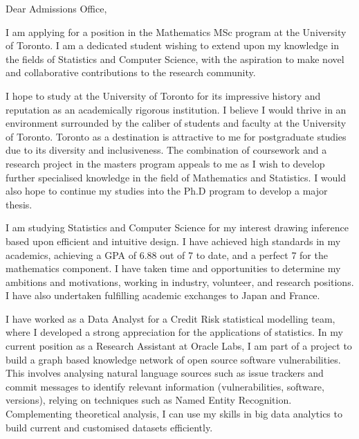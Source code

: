 
\noindent
Dear Admissions Office,
\vspace*{10pt}

I am applying for a position in the Mathematics MSc program at the University of Toronto. I am a dedicated student wishing to extend upon my knowledge in the fields of Statistics and Computer Science, with the aspiration to make novel and collaborative contributions to the research community. 
\vspace*{10pt}

I hope to study at the University of Toronto for its impressive history and reputation as an academically rigorous institution. I believe I would thrive in an environment surrounded by the caliber of students and faculty at the University of Toronto. Toronto as a destination is attractive to me for postgraduate studies due to its diversity and inclusiveness. The combination of coursework and a research project in the masters program appeals to me as I wish to develop further specialised knowledge in the field of Mathematics and Statistics. I would also hope to continue my studies into the Ph.D program to develop a major thesis.
\vspace*{10pt}

I am studying Statistics and Computer Science for my interest drawing inference based upon efficient and intuitive design. I have achieved high standards in my academics, achieving a GPA of 6.88 out of 7 to date, and a perfect 7 for the mathematics component. I have taken time and opportunities to determine my ambitions and motivations, working in industry, volunteer, and research positions. I have also undertaken fulfilling academic exchanges to Japan and France.
\vspace*{10pt}

I have worked as a Data Analyst for a Credit Risk statistical modelling team, where I developed a strong appreciation for the applications of statistics. In my current position as a Research Assistant at Oracle Labs, I am part of a project to build a graph based knowledge network of open source software vulnerabilities. This involves analysing natural language sources such as issue trackers and commit messages to identify relevant information (vulnerabilities, software, versions), relying on techniques such as Named Entity Recognition. Complementing theoretical analysis, I can use my skills in big data analytics to build current and customised datasets efficiently.
\vspace*{10pt}

